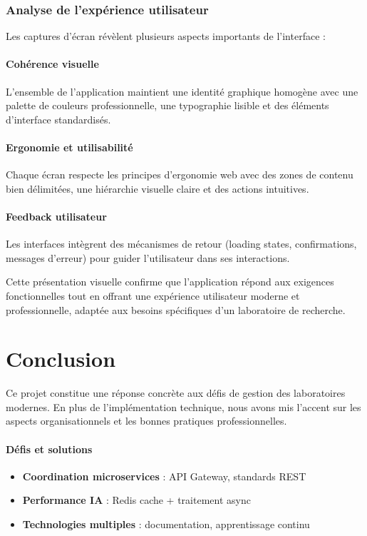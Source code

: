 \documentclass{rapportPfe}
\begin{document}
\subsubsection{Analyse de l'expérience utilisateur}

Les captures d'écran révèlent plusieurs aspects importants de l'interface :

\paragraph{Cohérence visuelle}
L'ensemble de l'application maintient une identité graphique homogène avec une palette de couleurs professionnelle, une typographie lisible et des éléments d'interface standardisés.

\paragraph{Ergonomie et utilisabilité}
Chaque écran respecte les principes d'ergonomie web avec des zones de contenu bien délimitées, une hiérarchie visuelle claire et des actions intuitives.

\paragraph{Feedback utilisateur}
Les interfaces intègrent des mécanismes de retour (loading states, confirmations, messages d'erreur) pour guider l'utilisateur dans ses interactions.

Cette présentation visuelle confirme que l'application répond aux exigences fonctionnelles tout en offrant une expérience utilisateur moderne et professionnelle, adaptée aux besoins spécifiques d'un laboratoire de recherche.

\newpage
\section{Conclusion}
Ce projet constitue une réponse concrète aux défis de gestion des laboratoires modernes. En plus de l'implémentation technique, nous avons mis l'accent sur les aspects organisationnels et les bonnes pratiques professionnelles.

\paragraph{Défis et solutions}
\begin{itemize}
    \item \textbf{Coordination microservices} : API Gateway, standards REST
    \item \textbf{Performance IA} : Redis cache + traitement async
    \item \textbf{Technologies multiples} : documentation, apprentissage continu
\end{itemize}
\end{document}
